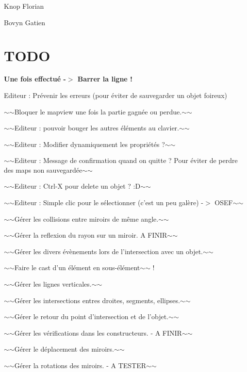 
\begin{DoxyItemize}
\item Knop Florian
\item Bovyn Gatien
\end{DoxyItemize}

\section*{T\+O\+D\+O}

{\bfseries Une fois effectué -\/$>$ Barrer la ligne !}


\begin{DoxyItemize}
\item Editeur \+: Prévenir les erreurs (pour éviter de sauvegarder un objet foireux)
\item $\sim$$\sim$\+Bloquer le mapview une fois la partie gagnée ou perdue.$\sim$$\sim$
\item $\sim$$\sim$\+Editeur \+: pouvoir bouger les autres éléments au clavier.$\sim$$\sim$
\item $\sim$$\sim$\+Editeur \+: Modifier dynamiquement les propriétés ?$\sim$$\sim$
\item $\sim$$\sim$\+Editeur \+: Message de confirmation quand on quitte ? Pour éviter de perdre des maps non sauvegardée$\sim$$\sim$
\item $\sim$$\sim$\+Editeur \+: Ctrl-\/\+X pour delete un objet ? \+:D$\sim$$\sim$
\item $\sim$$\sim$\+Editeur \+: Simple clic pour le sélectionner (c'est un peu galère) -\/$>$ O\+S\+E\+F$\sim$$\sim$
\item $\sim$$\sim$\+Gérer les collisions entre miroirs de même angle.$\sim$$\sim$
\item $\sim$$\sim$\+Gérer la reflexion du rayon sur un miroir. A F\+I\+N\+I\+R$\sim$$\sim$
\item $\sim$$\sim$\+Gérer les divers évènements lors de l'intersection avec un objet.$\sim$$\sim$
\item $\sim$$\sim$\+Faire le cast d'un élément en sous-\/élément$\sim$$\sim$ !
\item $\sim$$\sim$\+Gérer les lignes verticales.$\sim$$\sim$
\item $\sim$$\sim$\+Gérer les intersections entres droites, segments, ellipses.$\sim$$\sim$
\item $\sim$$\sim$\+Gérer le retour du point d'intersection et de l'objet.$\sim$$\sim$
\item $\sim$$\sim$\+Gérer les vérifications dans les constructeurs. -\/ A F\+I\+N\+I\+R$\sim$$\sim$
\item $\sim$$\sim$\+Gérer le déplacement des miroirs.$\sim$$\sim$
\item $\sim$$\sim$\+Gérer la rotations des miroirs. -\/ A T\+E\+S\+T\+E\+R$\sim$$\sim$
\end{DoxyItemize}

